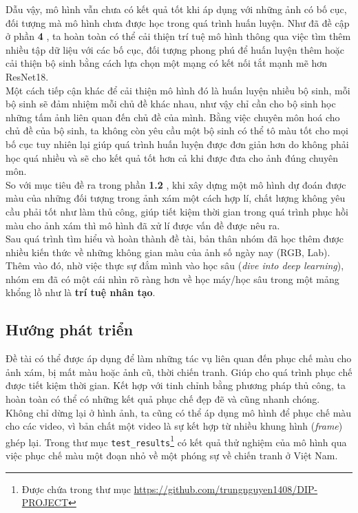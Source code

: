 \documentclass[a4paper]{article}
\begin{document}
\noindent
Dẫu vậy, mô hình vẫn chưa có kết quả tốt khi áp dụng với những ảnh có bố cục, đối tượng mà mô hình chưa được học trong quá trình huấn luyện. Như đã đề cập ở phần \textbf{4 }, ta hoàn toàn có thể cải thiện trí tuệ mô hình thông qua việc tìm thêm nhiều tập dữ liệu với các bố cục, đối tượng phong phú để huấn luyện thêm hoặc cải thiện bộ sinh bằng cách lựa chọn một mạng có kết nối tắt mạnh mẽ hơn ResNet18.\\
Một cách tiếp cận khác để cải thiện mô hình đó là huấn luyện nhiều bộ sinh, mỗi bộ sinh sẽ đảm nhiệm mỗi chủ đề khác nhau, như vậy chỉ cần cho bộ sinh học những tấm ảnh liên quan đến chủ đề của mình. Bằng việc chuyên môn hoá cho chủ đề của bộ sinh, ta không còn yêu cầu một bộ sinh có thể tô màu tốt cho mọi bố cục tuy nhiên lại giúp quá trình huấn luyện được đơn giản hơn do không phải học quá nhiều và sẽ cho kết quả tốt hơn cả khi được đưa cho ảnh đúng chuyên môn.\\

\noindent
So với mục tiêu đề ra trong phần \textbf{1.2 }, khi xây dựng một mô hình dự đoán được màu của những đối tượng trong ảnh xám một cách hợp lí, chất lượng không yêu cầu phải tốt như làm thủ công, giúp tiết kiệm thời gian trong quá trình phục hồi màu cho ảnh xám thì mô hình đã xử lí được vấn đề được nêu ra.\\

\noindent
Sau quá trình tìm hiểu và hoàn thành đề tài, bản thân nhóm đã học thêm được nhiều kiến thức về những không gian màu của ảnh số ngày nay (RGB, Lab). Thêm vào đó, nhờ việc thực sự đắm mình vào học sâu (\textit{dive into deep learning}), nhóm em đã có một cái nhìn rõ ràng hơn về học máy/học sâu trong một mảng khổng lồ như là \textbf{trí tuệ nhân tạo}.

\subsection{Hướng phát triển}
Đề tài có thể được áp dụng để làm những tác vụ liên quan đến phục chế màu cho ảnh xám, bị mất màu hoặc ảnh cũ, thời chiến tranh. Giúp cho quá trình phục chế được tiết kiệm thời gian. Kết hợp với tinh chỉnh bằng phương pháp thủ công, ta hoàn toàn có thể có những kết quả phục chế đẹp đẽ và cũng nhanh chóng.\\

\noindent
Không chỉ dừng lại ở hình ảnh, ta cũng có thể áp dụng mô hình để phục chế màu cho các video, vì bản chất một video là sự kết hợp từ nhiều khung hình (\textit{frame}) ghép lại. Trong thư mục \texttt{test\_results}\footnote{Được chứa trong thư mục \href{https://github.com/trungnguyen1408/DIP-PROJECT}{https://github.com/trungnguyen1408/DIP-PROJECT}} có kết quả thử nghiệm của mô hình qua việc phục chế màu một đoạn nhỏ về một phóng sự về chiến tranh ở Việt Nam.
\end{document}
